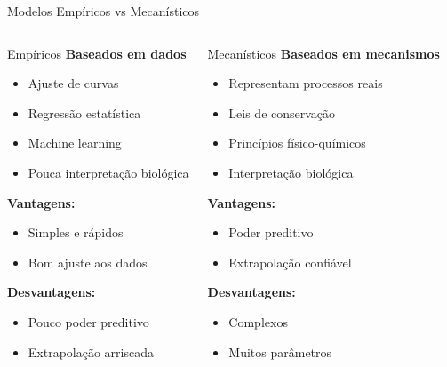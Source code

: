 \begin{frame}[shrink=20]{Modelos Empíricos vs Mecanísticos}
\small
\begin{columns}
\begin{block}{Empíricos}
\textbf{Baseados em dados}

\begin{itemize}
    \item Ajuste de curvas
    \item Regressão estatística
    \item Machine learning
    \item Pouca interpretação biológica
\end{itemize}

\vspace{0.2cm}

\textbf{Vantagens:}
\begin{itemize}
    \item Simples e rápidos
    \item Bom ajuste aos dados
\end{itemize}

\textbf{Desvantagens:}
\begin{itemize}
    \item Pouco poder preditivo
    \item Extrapolação arriscada
\end{itemize}
\end{block}

\begin{block}{Mecanísticos}
\textbf{Baseados em mecanismos}

\begin{itemize}
    \item Representam processos reais
    \item Leis de conservação
    \item Princípios físico-químicos
    \item Interpretação biológica
\end{itemize}

\vspace{0.2cm}

\textbf{Vantagens:}
\begin{itemize}
    \item Poder preditivo
    \item Extrapolação confiável
\end{itemize}

\textbf{Desvantagens:}
\begin{itemize}
    \item Complexos
    \item Muitos parâmetros
\end{itemize}
\end{block}
\end{columns}
\end{frame}


